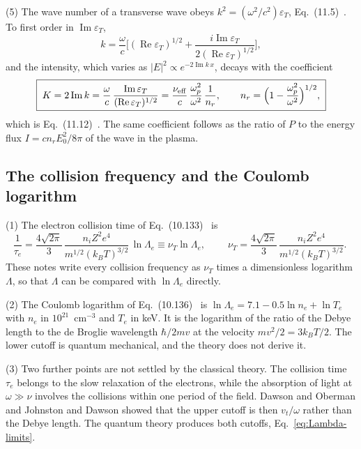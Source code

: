\documentclass[11pt]{article}
\numberwithin{equation}{section}
\newcommand{\nuT}{\nu_T}
\newcommand{\nueff}{\nu_{\rm eff}}
\newcommand{\kB}{k_B}
\DeclareMathOperator{\Imag}{Im}
\DeclareMathOperator{\Real}{Re}
\begin{document}
{\noindent}(5) The wave number of a transverse wave obeys
$k^2=(\omega^2/c^2)\varepsilon_T$, Eq.~(11.5)~\cite{Atzeni2004}. To first order
in $\Imag\varepsilon_T$,
\begin{equation}
k=\frac{\omega}{c}\Big[(\Real\varepsilon_T)^{1/2}+\frac{i\Imag\varepsilon_T}{2(\Real\varepsilon_T)^{1/2}}\Big],
\end{equation}
and the intensity, which varies as $|E|^2\propto e^{-2\Imag k\,x}$, decays with
the coefficient
\begin{equation}
\boxed{\;K=2\Imag k=\frac{\omega}{c}\,\frac{\Imag\varepsilon_T}{(\Real\varepsilon_T)^{1/2}}
=\frac{\nueff}{c}\,\frac{\omega_p^2}{\omega^2}\,\frac{1}{n_r},
\qquad n_r=\Big(1-\frac{\omega_p^2}{\omega^2}\Big)^{1/2},\;}
\label{eq:drude-K}
\end{equation}
which is Eq.~(11.12)~\cite{Atzeni2004}. The same coefficient follows as the
ratio of $P$ to the energy flux $I=cn_rE_0^2/8\pi$ of the wave in the plasma.

\subsection{The collision frequency and the Coulomb logarithm}
\label{sec:coulomblog}
{\noindent}(1) The electron collision time of
Eq.~(10.133)~\cite{Atzeni2004} is
\begin{equation}
\frac1{\tau_e}=\frac{4\sqrt{2\pi}}{3}\,
\frac{n_iZ^2e^4}{m^{1/2}(\kB T)^{3/2}}\,\ln\Lambda_e
\equiv\nuT\ln\Lambda_e,\qquad
\boxed{\;\nuT=\frac{4\sqrt{2\pi}}{3}\,\frac{n_iZ^2e^4}{m^{1/2}(\kB T)^{3/2}}.\;}
\label{eq:nuT}
\end{equation}
These notes write every collision frequency as $\nuT$ times a dimensionless
logarithm $\Lambda$, so that $\Lambda$ can be compared with $\ln\Lambda_e$
directly.

{\noindent}(2) The Coulomb logarithm of Eq.~(10.136)~\cite{Atzeni2004} is
$\ln\Lambda_e=7.1-0.5\ln n_e+\ln T_e$ with $n_e$ in $10^{21}$~cm$^{-3}$ and
$T_e$ in keV. It is the logarithm of the ratio of the Debye length to the
de Broglie wavelength $\hbar/2mv$ at the velocity $mv^2/2=3\kB T/2$. The lower
cutoff is quantum mechanical, and the theory does not derive it.

{\noindent}(3) Two further points are not settled by the classical theory.
The collision time $\tau_e$ belongs to the slow relaxation of the electrons,
while the absorption of light at $\omega\gg\nu$ involves the collisions within
one period of the field. Dawson and Oberman \cite{DawsonOberman1962} and
Johnston and Dawson \cite{JohnstonDawson1973} showed that the upper cutoff is
then $v_t/\omega$ rather than the Debye length. The quantum theory produces
both cutoffs, Eq.~\eqref{eq:Lambda-limits}.
\end{document}
